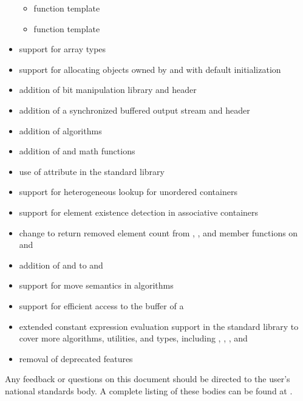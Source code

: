 \begin{itemize}
\begin{itemize}
  \item function template 
  \item function template 
\end{itemize}
\item {} support for array types
\item support for allocating objects owned by  and 
with default initialization
\item addition of bit manipulation library and  header
\item addition of a synchronized buffered output stream and  header
\item addition of  algorithms
\item addition of  and  math functions
\item use of \tcode{[[nodiscard]]} attribute in the standard library
\item support for heterogeneous lookup for unordered containers
\item support for element existence detection in associative containers
\item change to return removed element count
from , , and 
member functions on  and 
\item addition of  and 
to  and 
\item support for move semantics in  algorithms
\item support for efficient access to the buffer of a 
\item extended constant expression evaluation support in the standard library
to cover more algorithms, utilities, and types, including
, , , and 
\item removal of deprecated features
\end{itemize}

Any feedback or questions on this document
should be directed to the user's national standards body.
A complete listing of these bodies can be found at
\href{http://www.iso.org/members.html}{}.
